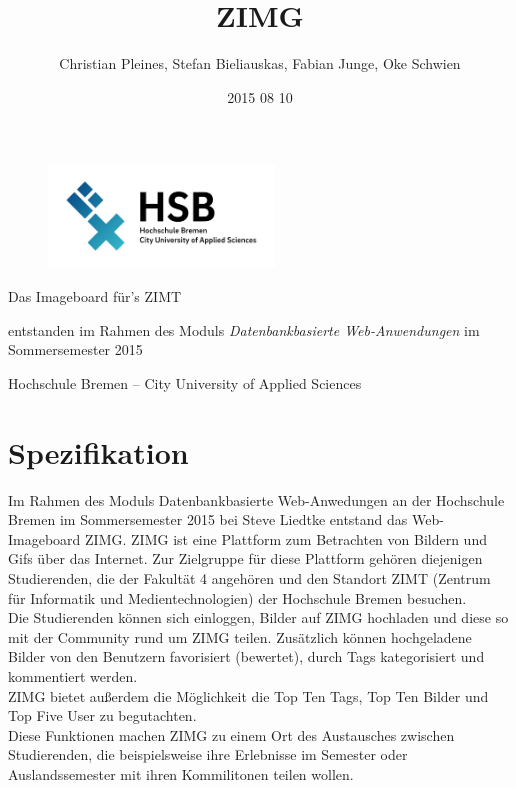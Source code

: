 \documentclass[12pt, oneside, a4paper]{article}		%
\title{ZIMG}
\author{Christian Pleines, Stefan Bieliauskas, Fabian Junge, Oke Schwien}
\date{2015 08 10}
\makeatletter
\renewcommand{\maketitle}{\bgroup\setlength{\parindent}{0pt}
	\begin{center}
		\vspace{4cm}
  		\seqsplit{\Huge{\textbf{\inserttitle}}}

  		\vspace{0.4cm}
  		\Large{Das Imageboard für's ZIMT}

  		\vspace{2cm}
  		\small{entstanden im Rahmen des Moduls \textit{Datenbankbasierte Web-Anwendungen} im Sommersemester 2015}

  		\vspace{2cm}
  		\large{\insertauthor}

  		\vspace{8cm}
  		\small{\insertdate}

  		\small{Hochschule Bremen -- City University of Applied Sciences}

	\end{center}\egroup
}
\let\inserttitle\@title
\let\insertauthor\@author
\let\insertdate\@date
\makeatother
\begin{document}
\begin{figure}[H]
	\centering
 	\includegraphics[width=6cm]{footage/Hochschule_Bremen_Logo_RGB} 
	\label{logoofhochschulebremengermany}
\end{figure}

\maketitle												%
\thispagestyle{empty}									%

\newpage

\tableofcontents

\newpage

\section{Spezifikation}

Im Rahmen des Moduls Datenbankbasierte Web-Anwedungen an der Hochschule Bremen im Sommersemester 2015 bei Steve Liedtke entstand das Web-Imageboard ZIMG. ZIMG ist eine Plattform zum Betrachten von Bildern und Gifs über das Internet. Zur Zielgruppe für diese Plattform gehören diejenigen Studierenden, die der Fakultät 4 angehören und den Standort ZIMT (Zentrum für Informatik und Medientechnologien) der Hochschule Bremen besuchen. \\
Die Studierenden können sich einloggen, Bilder auf ZIMG hochladen und diese so mit der Community rund um ZIMG teilen. Zusätzlich können hochgeladene Bilder von den Benutzern favorisiert (bewertet), durch Tags kategorisiert und kommentiert werden. \\
ZIMG bietet außerdem die Möglichkeit die Top Ten Tags, Top Ten Bilder und Top Five User zu begutachten. \\
Diese Funktionen machen ZIMG zu einem Ort des Austausches zwischen Studierenden, die beispielsweise ihre Erlebnisse im Semester oder Auslandssemester mit ihren Kommilitonen teilen wollen.
\end{document}
